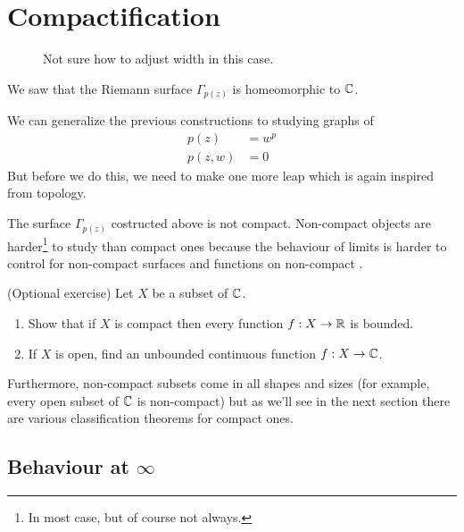 \section{Compactification}
\begin{figure}
  \centering
  
  \caption{Not sure how to adjust width in this case.}
\end{figure}
We saw that the Riemann surface $\Gamma_{p(z)}$ is homeomorphic to $\mathbb{C}$.

We can generalize the previous constructions to studying graphs of
\begin{align*}
  p(z) &= w^p \\
  p(z,w) &= 0
\end{align*}
But before we do this, we need to make one more leap which is again inspired from topology.

The surface $\Gamma_{p(z)}$ costructed above is not compact.
Non-compact objects are harder\footnote{In most case, but of course not always.} to study than compact ones because the behaviour of limits is harder to control for non-compact surfaces and functions on non-compact .
\begin{qbox}(Optional exercise)
  Let $X$ be a subset of $\mathbb{C}$.
  \begin{enumerate}
    \item Show that if $X$ is compact then every function $f:X \rightarrow \mathbb{R}$ is bounded.
    \item If $X$ is open, find an unbounded continuous function $f:X \rightarrow \mathbb{C}$.
  \end{enumerate}
\end{qbox}
Furthermore, non-compact subsets come in all shapes and sizes (for example, every open subset of $\mathbb{C}$ is non-compact) but as we'll see in the next section there are various classification theorems for compact ones.











\subsection{Behaviour at $\infty$}
